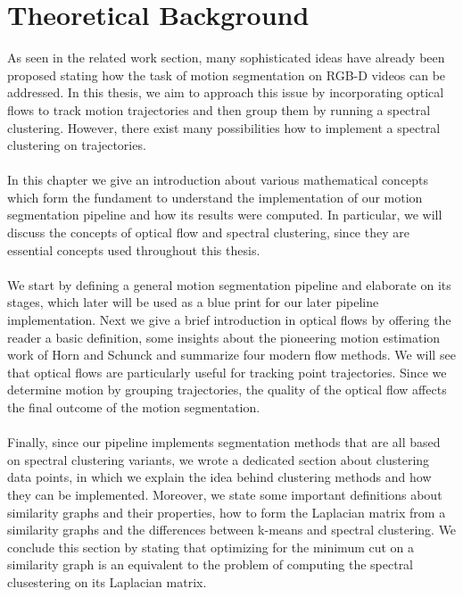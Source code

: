 \chapter{Theoretical Background}
As seen in the related work section, many sophisticated ideas have already been proposed stating how the task of motion segmentation on RGB-D videos can be addressed. In this thesis, we aim to approach this issue by incorporating optical flows to track motion trajectories and then group them by running a spectral clustering. However, there exist many possibilities how to implement a spectral clustering on trajectories. \\ \\
In this chapter we give an introduction about various mathematical concepts which form the fundament to understand the implementation of our motion segmentation pipeline and how its results were computed. In particular, we will discuss the concepts of optical flow and spectral clustering, since they are essential concepts used throughout this thesis. \\ \\
We start by defining a general motion segmentation pipeline and elaborate on its stages, which later will be used as a blue print for our later pipeline implementation. Next we give a brief introduction in optical flows by offering the reader a basic definition, some insights about the pioneering motion estimation work of Horn and Schunck and summarize four modern flow methods. We will see that optical flows are particularly useful for tracking point trajectories. Since we determine motion by grouping trajectories, the quality of the optical flow affects the final outcome of the motion segmentation. \\ \\
Finally, since our pipeline implements segmentation methods that are all based on spectral clustering variants, we wrote a dedicated section about clustering data points, in which we explain the idea behind clustering methods and how they can be implemented. Moreover, we state some important definitions about similarity graphs and their properties, how to form the Laplacian matrix from a similarity graphs and the differences between k-means and spectral clustering. We conclude this section by stating that optimizing for the minimum cut on a similarity graph is an equivalent to the problem of computing the spectral clusestering on its Laplacian matrix. 

